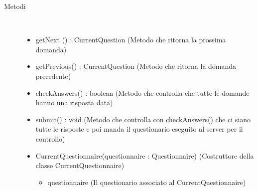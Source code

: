\begin{description}
\item[Metodi] \hfill \\
 \vspace{-7mm}
\begin{itemize}
\item getNext () : CurrentQuestion (Metodo che ritorna la prossima domanda)
\item getPrevious() : CurrentQuestion (Metodo che ritorna la domanda precedente)
\item checkAnswers() : boolean (Metodo che controlla che tutte le domande hanno una risposta data)
\item submit() : void (Metodo che controlla con checkAnswers() che ci siano tutte le risposte e poi manda il questionario eseguito al server per il controllo)
\item CurrentQuestionnaire(questionnaire : Questionnaire) (Costruttore della classe CurrentQuestionnaire)\begin{itemize}
\item questionnaire (Il questionario associato al CurrentQuestionnaire)
\end{itemize}

\end{itemize}

\end{description}

\vspace{0.5cm}
